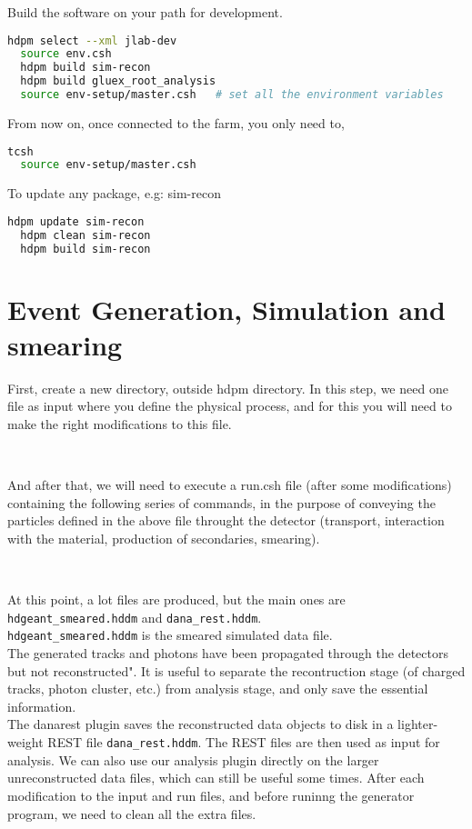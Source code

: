 \documentclass{article}
\begin{document}
Build the software on your path for development.

\begin{lstlisting}[language=bash]
  hdpm select --xml jlab-dev
  source env.csh    
  hdpm build sim-recon
  hdpm build gluex_root_analysis
  source env-setup/master.csh   # set all the environment variables
\end{lstlisting}

From now on, once connected to the farm, you only need to,
\begin{lstlisting}[language=bash]
  tcsh
  source env-setup/master.csh
\end{lstlisting}

To update any package, e.g: sim-recon
\begin{lstlisting}[language=bash]
  hdpm update sim-recon
  hdpm clean sim-recon
  hdpm build sim-recon
\end{lstlisting}

\section{Event Generation, Simulation and smearing}

First, create a new directory, outside hdpm directory.
\newline In this step, we need one file as input where you define the physical process, and for this you will need to make the right modifications to this file.



~\par And after that, we will need to execute a run.csh file (after some modifications) containing the following series of commands, in the purpose of conveying the particles defined in the above file throught the detector (transport, interaction with the material, production of secondaries, smearing).



~\par At this point, a lot files are produced, but the main ones are \texttt{hdgeant\_smeared.hddm} and \texttt{dana\_rest.hddm}.\\
\texttt{hdgeant\_smeared.hddm} is the smeared simulated data file.\\
The generated tracks and photons have been propagated through the detectors but not reconstructed". It is useful to separate the recontruction stage (of charged tracks, photon cluster, etc.) from analysis stage, and only save the essential information.\\
The danarest plugin saves the reconstructed data objects to disk in a lighter-weight REST file \texttt{dana\_rest.hddm}.
The REST files are then used as input for analysis. We can also use our analysis plugin directly on the larger unreconstructed data files, which can still be useful some times.
\newline After each modification to the input and run files, and before runinng the generator program, we need to clean all the extra files.
\end{document}
